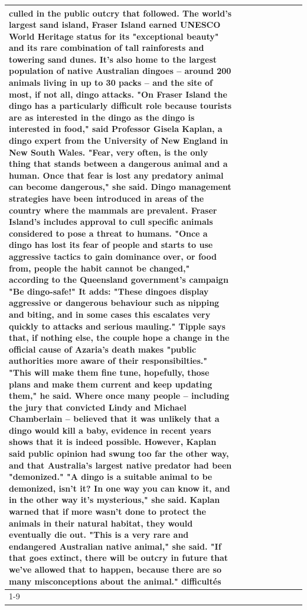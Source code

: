 \begin{table}[H]
\begin{tabular}{lllrlllll}
culled in the public outcry that followed. The world's largest sand island, Fraser Island earned UNESCO World Heritage status for its "exceptional beauty" and its rare combination of tall rainforests and towering sand dunes. It's also home to the largest population of native Australian dingoes -- around 200 animals living in up to 30 packs -- and the site of most, if not all, dingo attacks. "On Fraser Island the dingo has a particularly difficult role because tourists are as interested in the dingo as the dingo is interested in food," said Professor Gisela Kaplan, a dingo expert from the University of New England in New South Wales. "Fear, very often, is the only thing that stands between a dangerous animal and a human. Once that fear is lost any predatory animal can become dangerous," she said. Dingo management strategies have been introduced in areas of the country where the mammals are prevalent. Fraser Island's includes approval to cull specific animals considered to pose a threat to humans. "Once a dingo has lost its fear of people and starts to use aggressive tactics to gain dominance over, or food from, people the habit cannot be changed," according to the Queensland government's campaign "Be dingo-safe!" It adds: "These dingoes display aggressive or dangerous behaviour such as nipping and biting, and in some cases this escalates very quickly to attacks and serious mauling." Tipple says that, if nothing else, the couple hope a change in the official cause of Azaria's death makes "public authorities more aware of their responsibilties." "This will make them fine tune, hopefully, those plans and make them current and keep updating them," he said. Where once many people -- including the jury that convicted Lindy and Michael Chamberlain -- believed that it was unlikely that a dingo would kill a baby, evidence in recent years shows that it is indeed possible. However, Kaplan said public opinion had swung too far the other way, and that Australia's largest native predator had been "demonized." "A dingo is a suitable animal to be demonized, isn't it? In one way you can know it, and in the other way it's mysterious," she said. Kaplan warned that if more wasn't done to protect the animals in their natural habitat, they would eventually die out. "This is a very rare and endangered Australian native animal," she said. "If that goes extinct, there will be outcry in future that we've allowed that to happen, because there are so many misconceptions about the animal." difficultés \\
\cline{1-9}

\end{tabular}
\end{table}
